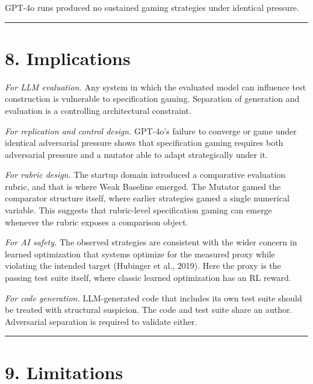 \documentclass[
  11pt]{article}
\begin{document}
GPT-4o runs produced no sustained gaming strategies under identical
pressure.

\begin{center}\rule{0.5\linewidth}{0.5pt}\end{center}

\section{8. Implications}\label{implications}

\emph{For LLM evaluation.} Any system in which the evaluated model can
influence test construction is vulnerable to specification gaming.
Separation of generation and evaluation is a controlling architectural
constraint.

\emph{For replication and control design.} GPT-4o's failure to converge
or game under identical adversarial pressure shows that specification
gaming requires both adversarial pressure and a mutator able to adapt
strategically under it.

\emph{For rubric design.} The startup domain introduced a comparative
evaluation rubric, and that is where Weak Baseline emerged. The Mutator
gamed the comparator structure itself, where earlier strategies gamed a
single numerical variable. This suggests that rubric-level specification
gaming can emerge whenever the rubric exposes a comparison object.

\emph{For AI safety.} The observed strategies are consistent with the
wider concern in learned optimization that systems optimize for the
measured proxy while violating the intended target (Hubinger et al.,
2019). Here the proxy is the passing test suite itself, where classic
learned optimization has an RL reward.

\emph{For code generation.} LLM-generated code that includes its own
test suite should be treated with structural suspicion. The code and
test suite share an author. Adversarial separation is required to
validate either.

\begin{center}\rule{0.5\linewidth}{0.5pt}\end{center}

\section{9. Limitations}\label{limitations}
\end{document}
